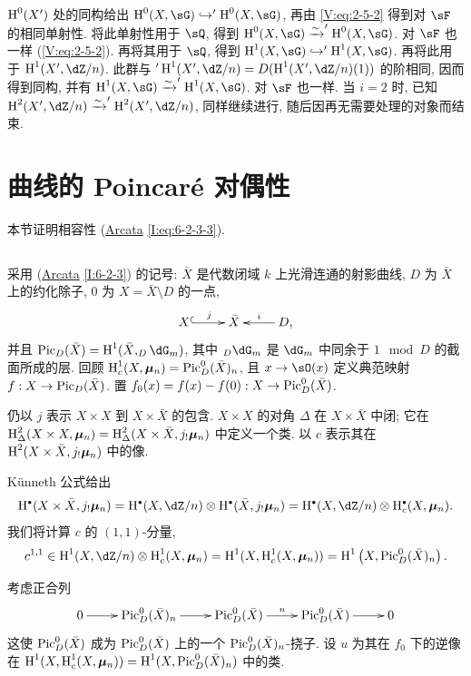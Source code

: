 $\operatorname{H}^0(X')$ 处的同构给出 $\h^0(X,\sG)\hookrightarrow '\h^0(X,\sG)$,
再由 \eqref{V:eq:2-5-2} 得到对 $\sF$ 的相同单射性.
将此单射性用于 $\sQ$, 得到 $\h^0(X,\sG)\iso '\h^0(X,\sG)$.
对 $\sF$ 也一样 (\eqref{V:eq:2-5-2}).
再将其用于 $\sQ$, 得到 $\h^1(X,\sG)\hookrightarrow '\h^1(X,\sG)$.
再将此用于 $\h^1(X',\dZ/n)$.
此群与 $'\h^1(X',\dZ/n)=D(\h^1(X',\dZ/n)(1))$ 的阶相同,
因而得到同构, 并有 $\h^1(X,\sG) \iso '\h^1(X,\sG)$. 对 $\sF$ 也一样.
当 $i=2$ 时, 已知 $\h^2(X',\dZ/n) \iso '\h^2(X',\dZ/n)$,
同样继续进行, 随后因再无需要处理的对象而结束.

\section{曲线的 Poincaré 对偶性}\label{V:3}

本节证明相容性 (\hyperref[I]{Arcata} \ref{I:eq:6-2-3-3}).

\subsection{}\label{V:3-1}

采用 (\hyperref[I]{Arcata} \ref{I:6-2-3}) 的记号:
$\bar X$ 是代数闭域 $k$ 上光滑连通的射影曲线,
$D$ 为 $\bar X$ 上的约化除子, $0$ 为 $X=\bar X\setminus D$ 的一点,
\[\xymatrix{
  X \ar@{^{(}->}[r]^-j
    & \bar X
    & \ar[l]_-i D \text{,}
}\]
并且 $\pic_D(\bar X)=\h^1(\bar X,_D\dG_m)$,
其中 $_D\dG_m$ 是 $\dG_m$ 中同余于 $1\mod D$ 的截面所成的层.
回顾 $\operatorname{H}_c^1(X,{\bm\mu}_n) = \operatorname{Pic}_D^0(\bar X)_n$,
且 $x\to \sO(x)$ 定义典范映射 $f:X\to \operatorname{Pic}_D(\bar X)$.
置 $f_0(x)=f(x)-f(0):X\to \operatorname{Pic}_D^0(\bar X)$.

仍以 $j$ 表示 $X\times X$ 到 $X\times \bar X$ 的包含.
$X\times X$ 的对角 $\Delta$ 在 $X\times \bar X$ 中闭;
它在 $\operatorname{H}_\Delta^2(X\times X,{\bm\mu}_n)=\operatorname{H}_\Delta^2(X\times \bar X,j_!{\bm\mu}_n)$ 中定义一个类.
以 $c$ 表示其在 $\operatorname{H}^2(X\times \bar X,j_!{\bm\mu}_n)$ 中的像.

K\"unneth 公式给出
\[
  \h^\bullet(X\times \bar X,j_!\dmu_n) = \h^\bullet(X,\dZ/n)\otimes \h^\bullet(\bar X,j_!\dmu_n) = \h^\bullet(X,\dZ/n)\otimes \h_c^\bullet(X,\dmu_n) \text{.}
\]
我们将计算 $c$ 的 $(1,1)$-分量,
\[
  c^{1,1} \in \h^1(X,\dZ/n)\otimes \h_c^1(X,\dmu_n) = \h^1(X,\h_c^1(X,\dmu_n)) = \h^1\left(X,\pic_D^0(\bar X)_n\right) \text{.}
\]

考虑正合列
\[\xymatrix{
  0 \ar[r]
    & \pic_D^0(\bar X)_n \ar[r]
    & \pic_D^0(\bar X) \ar[r]^n
    & \pic_D^0(\bar X) \ar[r]
    & 0
}\]
这使 $\operatorname{Pic}_D^0(\bar X)$ 成为 $\operatorname{Pic}_D^0(\bar X)$ 上的一个 $\operatorname{Pic}_D^0(\bar X)_n$-挠子.
设 $u$ 为其在 $f_0$ 下的逆像在
$\operatorname{H}^1(X,\operatorname{H}_c^1(X,{\bm\mu}_n))=\operatorname{H}^1(X,\operatorname{Pic}_D^0(\bar X)_n)$ 中的类.

